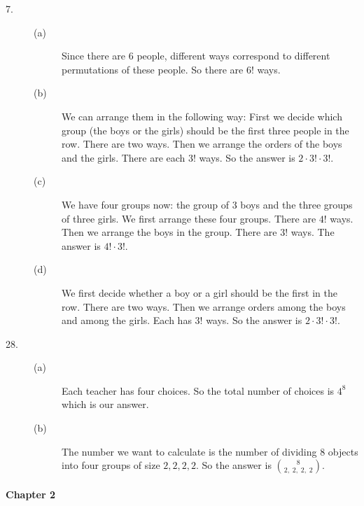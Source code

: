 \begin{description}

\item[{\rm 7.}] 

\begin{description}

\item[(a)] Since there are 6 people, different ways correspond to 
different permutations of these people. So there are $6!$ ways.

\item[(b)] We can arrange them in the following way: First we decide
which group (the boys or the girls) should be the first three people in the
row. There are two ways.  Then we arrange the orders of the boys and the
girls. There are each 3! ways. So the answer is $2 \cdot 3! \cdot 3!$.

\item[(c)] We have four groups now: the group of $3$ boys and 
the three groups of three girls. We first arrange these four groups. There 
are $4!$ ways. Then we arrange the boys in the group. There are $3!$ ways.
The answer is $4!\cdot 3!$.

\item[(d)] We first decide whether a boy or a girl should be the first 
in the row. There are two ways. Then we arrange orders among the boys 
and among the girls. Each has $3!$ ways. So the answer is $2\cdot 3!\cdot 3!$.

\end{description}

\item[{\rm 28.}] 

\begin{description}

\item[(a)] Each teacher has four choices. So the total number of choices
is $4^{8}$ which is our answer.

\item[(b)] The number we want to calculate is the number of 
dividing $8$ objects into four groups of size $2, 2, 2, 2$. So the 
answer is ${8\choose 2, \; 2, \; 2, \; 2}$.

\end{description}

\end{description}

\paragraph{Chapter 2}

